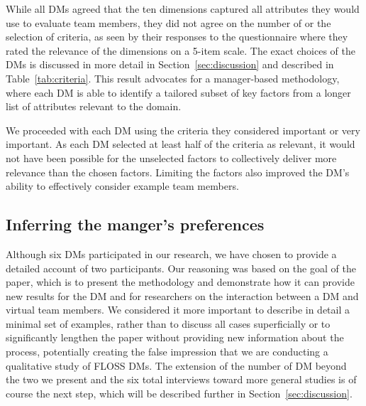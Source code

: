 While all DMs agreed that the ten dimensions captured all attributes they would use to evaluate team members, they did not agree on the number of or the selection of criteria, as seen by their responses to the questionnaire where they
rated the relevance of the dimensions on a 5-item scale.
The exact choices of the DMs is discussed in more detail in Section~\ref{sec:discussion} and described in Table~\ref{tab:criteria}. This result advocates for a manager-based methodology, where each DM is able to identify a tailored subset of key factors from a longer list of attributes relevant to the domain.

We proceeded with each DM using the criteria they considered important or
very important. As each DM selected at least half of the criteria as
relevant, it would not have been possible for the unselected factors to
collectively deliver more relevance than the chosen factors. Limiting the
factors also improved the DM's ability to effectively consider example
team members.

\subsection{Inferring the manger's preferences}\label{sec:results:sub:model}

Although six DMs participated in our research, we have chosen to provide
a detailed account of two participants. Our reasoning was based on the goal of the paper, which is to present the methodology and demonstrate how it can provide new results for the DM and for researchers on the interaction between a DM and virtual team members. We considered it more important to describe in detail a minimal set of examples, rather than to discuss all cases superficially or to significantly lengthen the paper without providing new information about the process, potentially creating the false impression that we are conducting a qualitative study of FLOSS DMs. The extension of the number of DM beyond the two we present and the six total interviews toward more general studies is of course the next step, which will be described further in Section~\ref{sec:discussion}.


